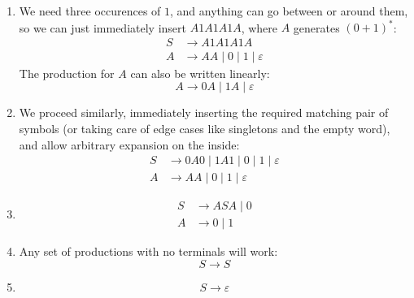 \documentclass{article}
\theoremstyle{definition}
\theoremstyle{definition}
\theoremstyle{remark}
\begin{document}
\bigskip

\begin{enumerate}
    \item[$(i)$] We need three occurences of $1$, and anything can go between or around them, so we can just immediately insert $A1A1A1A$, where $A$ generates $(0+1)^\ast$:
    \begin{align*}
        S&\longrightarrow A1A1A1A\\
        A&\longrightarrow AA\mid0\mid1\mid\varepsilon
    \end{align*}
    The production for $A$ can also be written linearly:
    \begin{equation*}
        A\longrightarrow0A\mid 1A\mid\varepsilon
    \end{equation*}
    
    \item[$(ii)$] We proceed similarly, immediately inserting the required matching pair of symbols (or taking care of edge cases like singletons and the empty word), and allow arbitrary expansion on the inside:
    \begin{align*}
        S&\longrightarrow 0A0\mid 1A1\mid0\mid1\mid\varepsilon\\
        A&\longrightarrow AA\mid0\mid1\mid\varepsilon
    \end{align*}

    \item[$(iii)$]\hspace*{1cm}
    \begin{align*}
        S&\longrightarrow ASA\mid0\\
        A&\longrightarrow0\mid1
    \end{align*}

    \item[$(iv)$] Any set of productions with no terminals will work:
    \begin{equation*}
        S\longrightarrow S
    \end{equation*}

    \item[$(v)$] \hspace*{1cm}
    \begin{equation*}
        S\longrightarrow\varepsilon
    \end{equation*}
\end{enumerate}
\end{document}
